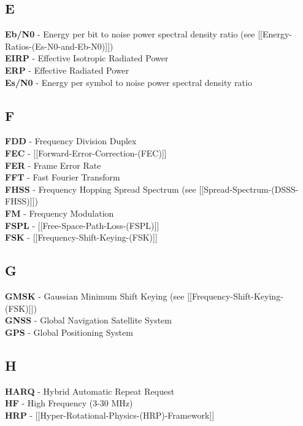 \subsection{E}\label{e}

\textbf{Eb/N0} - Energy per bit to noise power spectral density ratio
(see {[}{[}Energy-Ratios-(Es-N0-and-Eb-N0){]}{]})\\
\textbf{EIRP} - Effective Isotropic Radiated Power\\
\textbf{ERP} - Effective Radiated Power\\
\textbf{Es/N0} - Energy per symbol to noise power spectral density ratio

\subsection{F}\label{f}

\textbf{FDD} - Frequency Division Duplex\\
\textbf{FEC} - {[}{[}Forward-Error-Correction-(FEC){]}{]}\\
\textbf{FER} - Frame Error Rate\\
\textbf{FFT} - Fast Fourier Transform\\
\textbf{FHSS} - Frequency Hopping Spread Spectrum (see
{[}{[}Spread-Spectrum-(DSSS-FHSS){]}{]})\\
\textbf{FM} - Frequency Modulation\\
\textbf{FSPL} - {[}{[}Free-Space-Path-Loss-(FSPL){]}{]}\\
\textbf{FSK} - {[}{[}Frequency-Shift-Keying-(FSK){]}{]}

\subsection{G}\label{g}

\textbf{GMSK} - Gaussian Minimum Shift Keying (see
{[}{[}Frequency-Shift-Keying-(FSK){]}{]})\\
\textbf{GNSS} - Global Navigation Satellite System\\
\textbf{GPS} - Global Positioning System

\subsection{H}\label{h}

\textbf{HARQ} - Hybrid Automatic Repeat Request\\
\textbf{HF} - High Frequency (3-30 MHz)\\
\textbf{HRP} - {[}{[}Hyper-Rotational-Physics-(HRP)-Framework{]}{]}

